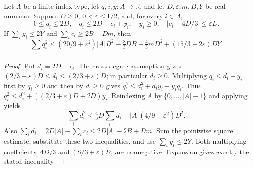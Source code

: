 \begin{lemma}
Let $A$ be a finite index type, let $q,c,y:A\to\mathbb R$, and let
$D,\varepsilon,m,B,Y$ be real numbers. Suppose $D\ge0$,
$0<\varepsilon\le1/2$, and, for every $i\in A$,
\[
0\le q_i\le2D,\quad q_i\le2D-c_i+y_i,\quad y_i\ge0,
\quad |c_i-4D/3|\le\varepsilon D.
\]
If $\sum_i y_i\le2Y$ and $\sum_i c_i\ge2B-Dm$, then
\[
\sum_i q_i^2\le(20/9+\varepsilon^2)|A|D^2
-\tfrac83 DB+\tfrac43 mD^2+(16/3+2\varepsilon)DY.
\]
\end{lemma}
\begin{proof}
Put $d_i=2D-c_i$. The cross-degree assumption gives
$(2/3-\varepsilon)D\le d_i\le(2/3+\varepsilon)D$; in particular $d_i\ge0$.
Multiplying $q_i\le d_i+y_i$ first by $q_i\ge0$ and then by
$d_i\ge0$ gives
$q_i^2\le d_i^2+d_i y_i+y_iq_i$.
Thus $q_i^2\le d_i^2+((2/3+\varepsilon)D+2D)y_i$.
Reindexing $A$ by $\{0,\ldots,|A|-1\}$ and applying
 yields
\[
\sum_i d_i^2\le\tfrac43D\sum_i d_i
-|A|(4/9-\varepsilon^2)D^2.
\]
Also $\sum_i d_i=2D|A|-\sum_i c_i\le2D|A|-2B+Dm$.
Sum the pointwise square estimate, substitute these two inequalities,
and use $\sum_i y_i\le2Y$. Both multiplying coefficients,
$4D/3$ and $(8/3+\varepsilon)D$, are nonnegative. Expansion gives
exactly the stated inequality.
\end{proof}
